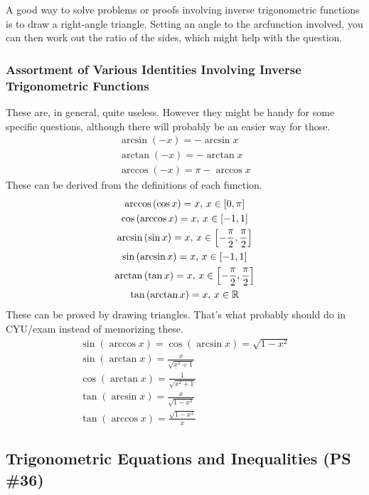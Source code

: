 \documentclass{article}
\begin{document}
A good way to solve problems or proofs involving inverse
trigonometric functions is to draw a right-angle triangle. Setting
an angle to the arcfunction involved, you can then work out the
ratio of the sides, which might help with the question.

\subsubsection{Assortment of Various Identities Involving Inverse
Trigonometric Functions}
These are, in general, quite useless. However they might be handy
for some specific questions, although there will probably be an
easier way for those.
\begin{gather*}
	\arcsin\left(-x\right)=-\arcsin x \\
	\arctan\left(-x\right)=-\arctan x \\
	\arccos\left(-x\right)=\pi-\arccos x
\end{gather*}
These can be derived from the definitions of each function.
\begin{gather*}
	\arccos\left(\cos x\right)=x,\,x\in\interval[scaled]{0}{\pi} \\
	\cos\left(\arccos x\right)=x,\,x\in\interval[scaled]{-1}{1} \\
	\arcsin\left(\sin x\right)=x,\,x\in\interval[scaled]
		{-\frac{\pi}{2}}{\frac{\pi}{2}} \\
	\sin\left(\arcsin x\right)=x,\,x\in\interval[scaled]{-1}{1} \\
	\arctan\left(\tan x\right)=x,\,x\in\interval[scaled]
		{-\frac{\pi}{2}}{\frac{\pi}{2}} \\
	\tan\left(\arctan x\right)=x,\,x\in\mathbb{R}
\end{gather*}
These can be proved by drawing triangles. That's what probably
should do in CYU/exam instead of memorizing these.
\begin{gather*}
	\sin\left(\arccos x\right)=
	\cos\left(\arcsin x\right)=\sqrt{1-x^2} \\
	\sin\left(\arctan x\right)=\frac{x}{\sqrt{x^2+1}} \\
	\cos\left(\arctan x\right)=\frac{1}{\sqrt{x^2+1}} \\
	\tan\left(\arcsin x\right)=\frac{x}{\sqrt{1-x^2}} \\
	\tan\left(\arccos x\right)=\frac{\sqrt{1-x^2}}{x}
\end{gather*}

\subsection{Trigonometric Equations and Inequalities (PS \#36)}
\end{document}
